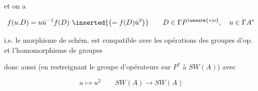 
et on a

\[
f(u.D)=u\bar u^{-1}f(D)\ \inserted{\left(=f(D)\bar u^2\right)}
\qquad D\in\Gamma P^{\unsure{*|o}},\quad u\in\Gamma A^*
\]

i.e. le morphisme de schém. est compatible avec les opérations des groupes d'op.  et l'homomorphisme de groupes


donc aussi (en restreignant le groupe d'opérateurs sur $P^*$ à $SW(A)$) avec

\[
u\longmapsto u^2\qquad SW(A)\longrightarrow SW(A)
\]

